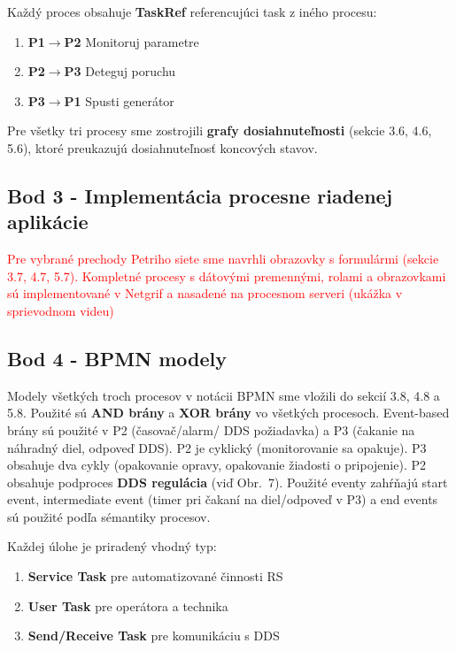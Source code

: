 \documentclass[12pt,a4paper]{article}
\begin{document}
Každý proces obsahuje \textbf{TaskRef} referencujúci task z iného procesu:
\begin{enumerate}[noitemsep, topsep=2pt, leftmargin=1.5cm]
    \item \textbf{P1$\to$P2} Monitoruj parametre
    \item \textbf{P2$\to$P3} Deteguj poruchu
    \item \textbf{P3$\to$P1} Spusti generátor
\end{enumerate}
\vspace{0.6em}
Pre všetky tri procesy sme zostrojili \textbf{grafy dosiahnuteľnosti} (sekcie 3.6, 4.6, 5.6), ktoré preukazujú
dosiahnuteľnosť koncových stavov.


\subsection{Bod 3 - Implementácia procesne riadenej aplikácie}
\textcolor{red}{Pre vybrané prechody Petriho siete sme navrhli obrazovky s formulármi (sekcie 3.7, 4.7, 5.7). Kompletné procesy s dátovými premennými, rolami a obrazovkami
sú implementované v Netgrif a nasadené na procesnom serveri
(ukážka v sprievodnom videu)}


\subsection{Bod 4 - BPMN modely}
Modely všetkých troch procesov v notácii BPMN sme vložili do  sekcií 3.8, 4.8 a 5.8. Použité sú \textbf{AND brány} a \textbf{XOR brány} vo všetkých procesoch. Event-based brány sú použité v P2 (časovač/alarm/
DDS požiadavka) a P3 (čakanie na náhradný diel, odpoveď DDS). P2 je cyklický (monitorovanie sa opakuje). P3 obsahuje dva cykly (opakovanie opravy, opakovanie žiadosti o pripojenie). P2 obsahuje podproces \textbf{DDS regulácia} (viď Obr.~7).
Použité eventy zahŕňajú start event, intermediate event (timer
pri čakaní na diel/odpoveď v P3) a end events sú použité podľa
sémantiky procesov. 

\vspace{0.6em}
Každej úlohe je priradený vhodný typ:
\begin{enumerate}[noitemsep, topsep=2pt, leftmargin=1.5cm]
    \item \textbf{Service Task} pre automatizované činnosti RS
    \item \textbf{User Task} pre operátora a technika
    \item \textbf{Send/Receive Task} pre komunikáciu s DDS
\end{enumerate}
\vspace{0.6em}
\end{document}
